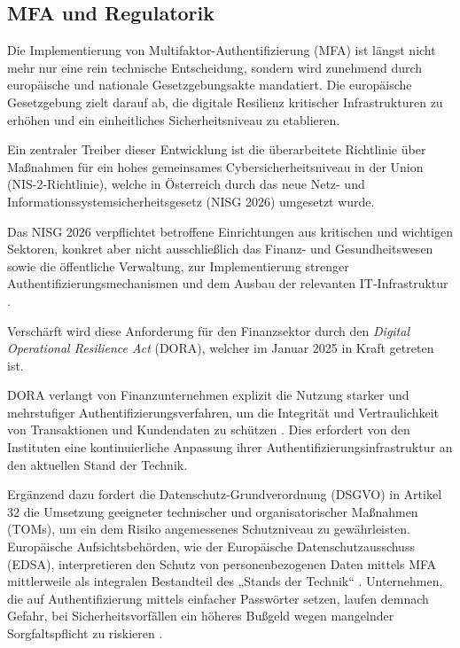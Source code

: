 \subsection{MFA und Regulatorik}
Die Implementierung von Multifaktor-Authentifizierung (MFA) ist längst nicht mehr nur eine rein technische Entscheidung, sondern wird zunehmend durch europäische und nationale Gesetzgebungsakte mandatiert. Die europäische Gesetzgebung zielt darauf ab, die digitale Resilienz kritischer Infrastrukturen zu erhöhen und ein einheitliches Sicherheitsniveau zu etablieren. 

Ein zentraler Treiber dieser Entwicklung ist die überarbeitete Richtlinie über Maßnahmen für ein hohes gemeinsames Cybersicherheitsniveau in der Union (NIS-2-Richtlinie), welche in Österreich durch das neue Netz- und Informationssystemsicherheitsgesetz (NISG 2026) umgesetzt wurde.

Das NISG 2026 verpflichtet betroffene Einrichtungen aus kritischen und wichtigen Sektoren, konkret aber nicht ausschließlich das Finanz- und Gesundheitswesen sowie die öffentliche Verwaltung, zur Implementierung strenger Authentifizierungsmechanismen und dem Ausbau der relevanten IT-Infrastruktur \cite[Art. 21]{eu2022a}.

Verschärft wird diese Anforderung für den Finanzsektor durch den \textit{Digital Operational Resilience Act} (DORA), welcher im Januar 2025 in Kraft getreten ist.

DORA verlangt von Finanzunternehmen explizit die Nutzung starker und mehrstufiger Authentifizierungsverfahren, um die Integrität und Vertraulichkeit von Transaktionen und Kundendaten zu schützen \cite[Art. 28 Abs. 2]{eu2022b}. Dies erfordert von den Instituten eine kontinuierliche Anpassung ihrer Authentifizierungsinfrastruktur an den aktuellen Stand der Technik.

Ergänzend dazu fordert die Datenschutz-Grundverordnung (DSGVO) in Artikel 32 die Umsetzung geeigneter technischer und organisatorischer Maßnahmen (TOMs), um ein dem Risiko angemessenes Schutzniveau zu gewährleisten. Europäische Aufsichtsbehörden, wie der Europäische Datenschutzausschuss (EDSA), interpretieren den Schutz von personenbezogenen Daten mittels MFA mittlerweile als integralen Bestandteil des „Stands der Technik“ \cite[S. 11]{enisa2025}. Unternehmen, die auf Authentifizierung mittels einfacher Passwörter setzen, laufen demnach Gefahr, bei Sicherheitsvorfällen ein höheres Bußgeld wegen mangelnder Sorgfaltspflicht zu riskieren \cite[S. 42]{krykavska2023}.

